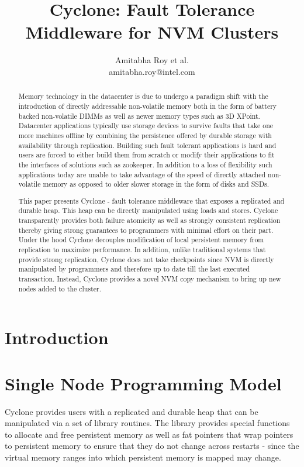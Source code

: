 \documentclass[twocolumn]{article}
\begin{document}
\title{Cyclone: Fault Tolerance Middleware for NVM Clusters}
\author{Amitabha Roy et al. \\ amitabha.roy@intel.com}
\maketitle
\begin{abstract}
Memory technology in the datacenter is due to undergo a paradigm shift with the
introduction of directly addressable non-volatile memory both in the form of
battery backed non-volatile DIMMs as well as newer memory types such as
3D XPoint. Datacenter applications typically use storage devices to survive
faults that take one more machines offline by combining the persistence offered by
durable storage with availability through replication. Building such fault
tolerant applications is hard and users are forced to either build
them from scratch or modify their applications to fit the interfaces of solutions
such as zookeeper. In addition to a loss of flexibility such applications today
are unable to take advantage of the speed of directly attached non-volatile
memory as opposed to older slower storage in the form of disks and SSDs.

This paper presents Cyclone - fault tolerance middleware that exposes a
replicated and durable heap. This heap can be directly manipulated using loads and
stores. Cyclone transparently provides both failure atomicity as well as
strongly consistent replication thereby giving strong guarantees to programmers
with minimal effort on their part. Under the hood Cyclone decouples modification
of local persistent memory from replication to maximize performance. In
addition, unlike traditional systems that provide strong replication, Cyclone
does not take checkpoints since NVM is directly manipulated by programmers and
therefore up to date till the last executed transaction. Instead, Cyclone
provides a novel NVM copy mechanism to bring up new nodes added to the cluster.
\end{abstract}  

\section{Introduction}

\section{Single Node Programming Model}
Cyclone provides users with a replicated and durable heap that can be
manipulated via a set of library routines. The library provides special
functions to allocate and free persistent memory as well as fat pointers that
wrap pointers to persistent memory to ensure that they do not change across
restarts - since the virtual memory ranges into which persistent memory is
mapped may change.
\end{document}
